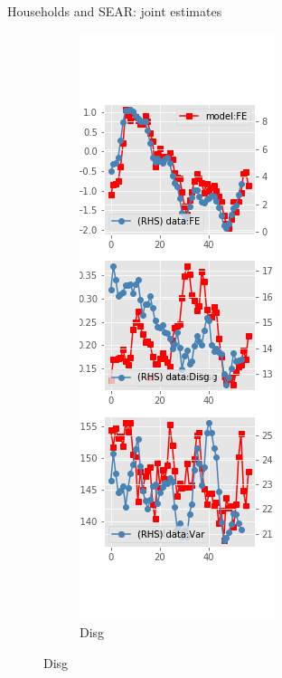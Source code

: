 \documentclass{beamer}
\begin{document}
\begin{frame}{Households and SEAR: joint estimates}
\begin{figure}[ht]
\begin{subfigure}[b]{0.2\textwidth}
		\end{subfigure}
		\hfill
		\begin{subfigure}[b]{0.2\textwidth}
			\caption{Disg}
			\includegraphics[width=\textwidth, height = 0.8\textheight]{figuresDraft/sce_se_est_diag1.png}

\end{subfigure}
\end{figure}
\end{frame}
\end{document}
